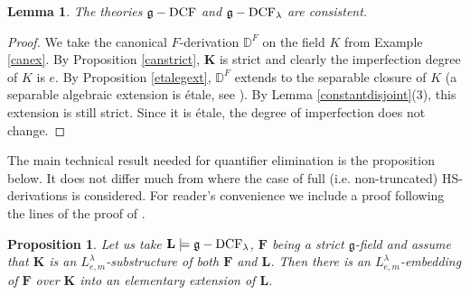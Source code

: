 \documentclass[10pt]{amsart}
\newtheorem{prop}[theorem]{Proposition}
\newtheorem{lemma}[theorem]{Lemma}
\theoremstyle{definition}
\begin{document}
\noindent
\begin{lemma}\label{consistent}
The theories $\mathfrak{g}-\operatorname{DCF}$ and $\mathfrak{g}-\operatorname{DCF}_{\lambda}$ are consistent.
\end{lemma}
\begin{proof}
We take the canonical $F$-derivation $\mathbb{D}^F$ on the field $K$ from Example \ref{canex}. By Proposition \ref{canstrict}, $\mathbf{K}$ is strict and clearly the imperfection degree of $K$ is $e$. By Proposition \ref{etalegext}, $\mathbb{D}^F$ extends to the separable closure of $K$ (a separable algebraic extension is \'{e}tale, see \cite[Thm. 26.7]{mat}). By Lemma \ref{constantdisjoint}(3), this extension is still strict. Since it is \'{e}tale, the degree of imperfection  does not change.
\end{proof}
\noindent
The main technical result needed for quantifier elimination is the proposition below. It does not differ much from \cite[3.1]{Zieg2} where the case of full (i.e. non-truncated) HS-derivations is considered. For reader's convenience we include a proof following the lines of the proof of \cite[3.1]{Zieg2}.
\begin{prop}\label{elemamal}
Let us take $\mathbf{L}\models \mathfrak{g}-\operatorname{DCF}_{\lambda}$, $\mathbf{F}$ being a strict $\mathfrak{g}$-field and assume that $\mathbf{K}$ is an  $L^{\lambda}_{e,m}$-substructure of both $\mathbf{F}$ and $\mathbf{L}$. Then there is an $L^{\lambda}_{e,m}$-embedding of $\mathbf{F}$ over $\mathbf{K}$ into an elementary extension of $\mathbf{L}$. \end{prop}
\end{document}

